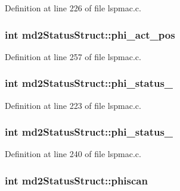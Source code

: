 Definition at line 226 of file lspmac.\-c.

\hypertarget{structmd2StatusStruct_a4de22995a72ff6e72a1a9ccab6d00620}{
\subsubsection[{phi\-\_\-act\-\_\-pos}]{\setlength{\rightskip}{0pt plus 5cm}int md2\-Status\-Struct\-::phi\-\_\-act\-\_\-pos}}\label{structmd2StatusStruct_a4de22995a72ff6e72a1a9ccab6d00620}


Definition at line 257 of file lspmac.\-c.

\hypertarget{structmd2StatusStruct_ad8b8fd90ffff43016e2adaab5ccbfa02}{
\subsubsection[{phi\-\_\-status\-\_\-1}]{\setlength{\rightskip}{0pt plus 5cm}int md2\-Status\-Struct\-::phi\-\_\-status\-\_}}\label{structmd2StatusStruct_ad8b8fd90ffff43016e2adaab5ccbfa02}


Definition at line 223 of file lspmac.\-c.

\hypertarget{structmd2StatusStruct_a0e6cea4c32cb34e602b9ac3d21259219}{
\subsubsection[{phi\-\_\-status\-\_\-2}]{\setlength{\rightskip}{0pt plus 5cm}int md2\-Status\-Struct\-::phi\-\_\-status\-\_}}\label{structmd2StatusStruct_a0e6cea4c32cb34e602b9ac3d21259219}


Definition at line 240 of file lspmac.\-c.

\hypertarget{structmd2StatusStruct_abe3d4a61a15f54590b061e23b45e659c}{
\subsubsection[{phiscan}]{\setlength{\rightskip}{0pt plus 5cm}int md2\-Status\-Struct\-::phiscan}}\label{structmd2StatusStruct_abe3d4a61a15f54590b061e23b45e659c}


